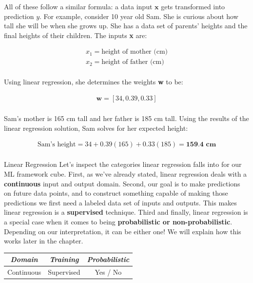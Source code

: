 All of these follow a similar formula: a data input $\textbf{x}$ gets transformed into prediction $y$. For example, consider 10 year old Sam. She is curious about how tall she will be when she grows up. She has a data set of parents' heights and the final heights of their children. The inputs \textbf{x} are:

\begin{align*}
x_{1} = \text{height of mother (cm)} \\
x_{2} = \text{height of father (cm)} \\
\end{align*}

Using linear regression, she determines the weights \textbf{w} to be:

\begin{align*}
\textbf{w} = [34, 0.39, 0.33] \\
\end{align*}

Sam's mother is 165 cm tall and her father is 185 cm tall. Using the results of the linear regression solution, Sam solves for her expected height:

\begin{align*}
\text{Sam's height} = 34 + 0.39(165) + 0.33(185) = \textbf{159.4 cm} \\
\end{align*}

\begin{mlcube}{Linear Regression}
Let's inspect the categories linear regression falls into for our ML framework cube. First, as we've already stated, linear regression deals with a \textbf{continuous} input and output domain. Second, our goal is to make predictions on future data points, and to construct something capable of making those predictions we first need a labeled data set of inputs and outputs. This makes linear regression is a \textbf{supervised} technique. Third and finally, linear regression is a special case when it comes to being \textbf{probabilistic or non-probabilistic}. Depending on our interpretation, it can be either one! We will explain how this works later in the chapter.
\begin{center}
    \begin{tabular}{c|c|c}
    \textit{\textbf{Domain}} & \textit{\textbf{Training}} & \textit{\textbf{Probabilistic}} \\
    \hline
    Continuous & Supervised & Yes / No \\
    \end{tabular}
\end{center}
\end{mlcube}

